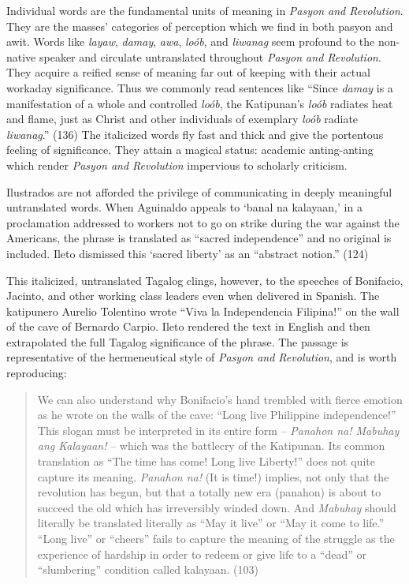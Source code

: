 Individual words are the fundamental units of meaning in \textit{Pasyon and Revolution}. They are the masses' categories of perception which we find in both pasyon and awit. Words like \textit{layaw}, \textit{damay}, \textit{awa}, \textit{lo\'ob}, and \textit{liwanag} seem profound to the non-native speaker and circulate untranslated throughout \textit{Pasyon and Revolution}. They acquire a reified sense of meaning far out of keeping with their actual workaday significance.  Thus we commonly read sentences like \enquote{Since \textit{damay} is a manifestation of a whole and controlled \textit{lo\'ob}, the Katipunan’s \textit{lo\'ob} radiates heat and flame, just as Christ and other individuals of exemplary \textit{lo\'ob} radiate \textit{liwanag}.} (136) The italicized words fly fast and thick and give the portentous feeling of significance. They attain a magical status: academic anting-anting which render \textit{Pasyon and Revolution} impervious to scholarly criticism.   

Ilustrados are not afforded the privilege of communicating in deeply meaningful untranslated words. When Aguinaldo appeals to \enquote*{banal na kalayaan,} in a proclamation addressed to workers not to go on strike during the war against the Americans, the phrase is translated as \enquote{sacred independence} and no original is included. Ileto dismissed this \enquote*{sacred liberty} as an \enquote{abstract notion.} (124)

This italicized, untranslated Tagalog clings, however, to the speeches of Bonifacio, Jacinto, and other working class leaders even when delivered in Spanish. The katipunero Aurelio Tolentino wrote \enquote{Viva la Independencia Filipina!} on the wall of the cave of Bernardo Carpio. Ileto rendered the text in English and then extrapolated the full Tagalog significance of the phrase. The passage is representative of the hermeneutical style of \textit{Pasyon and Revolution}, and is worth reproducing:

\begin{quote}
We can also understand why Bonifacio's hand trembled with fierce emotion as he wrote on the walls of the cave: \enquote{Long live Philippine independence!} This slogan must be interpreted in its entire form -- \textit{Panahon na! Mabuhay ang Kalayaan!} -- which was the battlecry of the Katipunan. Its common translation as \enquote{The time has come! Long live Liberty!} does not quite capture its meaning. \textit{Panahon na!} (It is time!) implies, not only that the revolution has begun, but that a totally new era (panahon) is about to succeed the old which has irreversibly winded down. And \textit{Mabuhay} should literally be translated literally as \enquote{May it live} or \enquote{May it come to life.} \enquote{Long live} or \enquote{cheers} fails  to capture the meaning of the struggle as the experience of hardship in order to redeem or give life to a \enquote{dead} or \enquote{slumbering} condition called kalayaan. (103)
\end{quote} 

